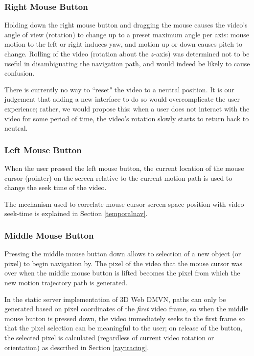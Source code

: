 \subsubsection{Right Mouse Button}
\label{uirmb}
Holding down the right mouse button and dragging the mouse causes the video's angle of view (rotation) to change up to a preset maximum angle per axis: mouse motion to the left or right induces yaw, and motion up or down causes pitch to change. Rolling of the video (rotation about the $z$-axis) was determined not to be useful in disambiguating the navigation path, and would indeed be likely to cause confusion.
\par There is currently no way to ``reset" the video to a neutral position. It is our judgement that adding a new interface to do so would overcomplicate the user experience; rather, we would propose this: when a user does not interact with the video for some period of time, the video's rotation slowly starts to return back to neutral.
\par 

\subsubsection{Left Mouse Button}
\label{uilmb}
When the user pressed the left mouse button, the current location of the mouse cursor (pointer) on the screen relative to the current motion path is used to change the seek time of the video.
\par The mechanism used to correlate mouse-cursor screen-space position with video seek-time is explained in Section \ref{temporalnav}.

\subsubsection{Middle Mouse Button}
\label{uimmb}
Pressing the middle mouse button down allows to selection of a new object (or pixel) to begin navigation by. The pixel of the video that the mouse cursor was over when the middle mouse button is lifted becomes the pixel from which the new motion trajectory path is generated.
\par In the static server implementation of 3D Web DMVN, paths can only be generated based on pixel coordinates of the \emph{first} video frame, so when the middle mouse button is pressed down, the video immediately seeks to the first frame so that the pixel selection can be meaningful to the user; on release of the button, the selected pixel is calculated (regardless of current video rotation or orientation) as described in Section \ref{raytracing}.


